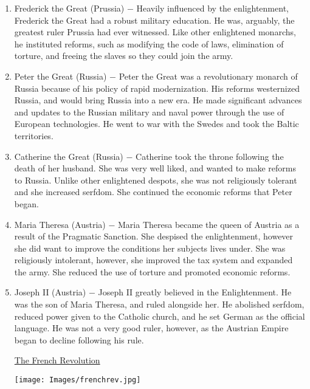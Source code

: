 \documentclass[12pt]{article}
\begin{document}
\begin{enumerate}
\item Frederick the Great (Prussia) $-$ Heavily influenced by the enlightenment, Frederick the Great had a robust military education. He was, arguably, the greatest ruler Prussia had ever witnessed. Like other enlightened monarchs, he instituted reforms, such as modifying the code of laws, elimination of torture, and freeing the slaves so they could join the army.

\item Peter the Great (Russia) $-$ Peter the Great was a revolutionary monarch of Russia because of his policy of rapid modernization. His reforms westernized Russia, and would bring Russia into a new era. He made significant advances and updates to the Russian military and naval power through the use of European technologies. He went to war with the Swedes and took the Baltic territories.

\item Catherine the Great (Russia) $-$ Catherine took the throne following the death of her husband. She was very well liked, and wanted to make reforms to Russia. Unlike other enlightened despots, she was not religiously tolerant and she increased serfdom. She continued the economic reforms that Peter began.

\item Maria Theresa (Austria) $-$ Maria Theresa became the queen of Austria as a result of the Pragmatic Sanction. She despised the enlightenment, however she did want to improve the conditions her subjects lives under. She was religiously intolerant, however, she improved the tax system and expanded the army. She reduced the use of torture and promoted economic reforms.

\item Joseph II (Austria) $-$ Joseph II greatly believed in the Enlightenment. He was the son of Maria Theresa, and ruled alongside her. He abolished serfdom, reduced power given to the Catholic church, and he set German as the official language. He was not a very good ruler, however, as the Austrian Empire began to decline following his rule.

\newpage
\begin{center}
\end{center}
\begin{center}
\end{center}
\begin{center}
\underline{\Huge The French Revolution}
\end{center}
\vspace{50pt}
\texttt{[image: Images/frenchrev.jpg]}
\newpage


\end{enumerate}
\end{document}
